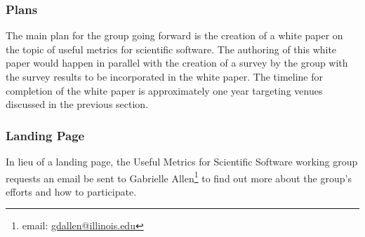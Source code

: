 \subsubsection{Plans}

The main plan for the group going forward is the creation of a white paper on
the topic of useful metrics for scientific software. The authoring of this white
paper would happen in parallel with the creation of a survey by the group with
the survey results to be incorporated in the white paper. The timeline for
completion of the white paper is approximately one year targeting venues
discussed in the previous section.

\subsubsection{Landing Page}

In lieu of a landing page, the Useful Metrics for Scientific Software working
group requests an email be sent to Gabrielle Allen\footnote{email: 
\href{mailto:gdallen@illinois.edu}{gdallen@illinois.edu}} to find out more
about the group's efforts and how to participate.
